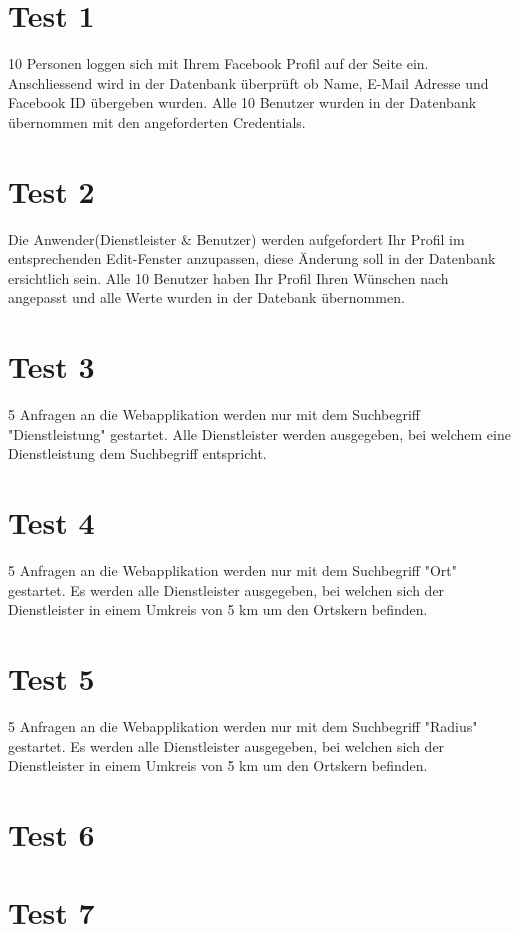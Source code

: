 \documentclass[11pt,a4paper]{scrreprt}
\begin{document}
{\section{Test 1}
10 Personen loggen sich mit Ihrem Facebook Profil auf der Seite ein. Anschliessend wird in der Datenbank überprüft ob Name, E-Mail Adresse und Facebook ID übergeben wurden. Alle 10 Benutzer wurden in der Datenbank übernommen mit den angeforderten Credentials. 

\section{Test 2}
Die Anwender(Dienstleister & Benutzer) werden aufgefordert Ihr Profil im entsprechenden Edit-Fenster anzupassen, diese Änderung soll in der Datenbank ersichtlich sein. Alle 10 Benutzer haben Ihr Profil Ihren Wünschen nach angepasst und alle Werte wurden in der Datebank übernommen.


\section{Test 3}

5 Anfragen an die Webapplikation werden nur mit dem Suchbegriff "Dienstleistung" gestartet. Alle Dienstleister werden ausgegeben, bei welchem eine Dienstleistung dem Suchbegriff entspricht. 

\section{Test 4}

5 Anfragen an die Webapplikation werden nur mit dem Suchbegriff "Ort" gestartet. 
Es werden alle Dienstleister ausgegeben, bei welchen sich der Dienstleister in einem Umkreis von 5 km um den Ortskern befinden. 

\section{Test 5}

5 Anfragen an die Webapplikation werden nur mit dem Suchbegriff "Radius" gestartet. 
Es werden alle Dienstleister ausgegeben, bei welchen sich der Dienstleister in einem Umkreis von 5 km um den Ortskern befinden. 

\section{Test 6}

\section{Test 7}

}
\end{document}
